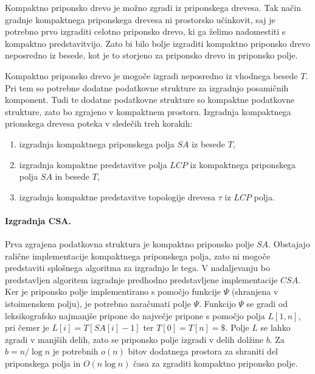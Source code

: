 Kompaktno priponsko drevo je možno zgradi iz priponskega drevesa. Tak način gradnje kompaktnega priponskega drevesa ni prostorsko učinkovit, saj je potrebno prvo izgraditi celotno priponsko drevo, ki ga želimo nadomestiti s kompaktno predstavitvijo. Zato bi bilo bolje izgraditi kompaktno priponsko drevo neposredno iz besede, kot je to storjeno za priponsko drevo in priponsko polje.

Kompaktno priponsko drevo je mogoče izgradi neposredno iz vhodnega besede $T$. Pri tem so potrebne dodatne podatkovne strukture za izgradnjo posamičnih komponent. Tudi te dodatne podatkovne strukture so kompaktne podatkovne strukture, zato bo  zgrajeno v kompaktnem prostoru. Izgradnja kompaktnega prionskega drevesa poteka v sledečih treh korakih:
\begin{enumerate}
    \item izgradnja kompaktnega priponskega polja $SA$ iz besede $T$,
    \item izgradnja kompaktne predstavitve polja $LCP$ iz kompaktnega priponskega polja $SA$ in besede $T$,
    \item izgradnja kompaktne predstavitve topologije drevesa $\tau$ iz $LCP$ polja.
\end{enumerate}

\paragraph{Izgradnja CSA.}

Prva zgrajena podatkovna struktura je kompaktno priponsko polje $SA$. Obstajajo ralične implementacije kompaktnega priponskega polja, zato ni mogoče predstaviti splošnega algoritma za izgradnjo le tega. V nadaljevanju bo predstavljen algoritem izgradnje predhodno predstavljene implementacije $CSA$. Ker je priponsko polje implementirano s pomočjo funkcije $\Psi$ (shranjena v istoimenskem polju), je potrebno naračunati polje $\Psi$. 
Funkcijo $\Psi$ se gradi od leksikografsko najmanjše pripone do največje pripone s pomočjo polja $L[1,n]$, pri čemer je $L[i]=T[SA[i]-1]$ ter $T[0]=T[n]=\$$.
Polje $L$ se lahko zgradi v manjših delih, zato se priponsko polje izgradi v delih dolžine $b$. Za $b=n/\log{n}$ je potrebnih $o(n)$ bitov dodatnega prostora za shraniti del priponskega polja in $O(n\log{n})$ časa za zgraditi kompaktno priponsko polje\cite{Navarro2016}.

